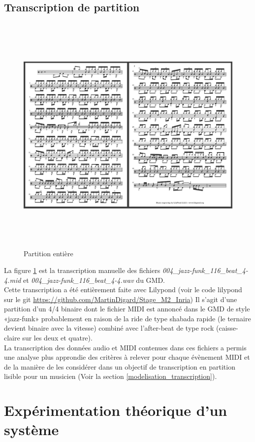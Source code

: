 \subsection*{Transcription de partition}
\begin{figure}[h]
	\includegraphics[height=120mm, width=160mm]{z_images/4_experimentations/1_analyse_midi_audio/3_partition.png}
	\caption{Partition entière}
	\label{partition_entiere}
\end{figure}
La figure \ref{partition_entiere} est la transcription manuelle des fichiers \textit{004\_jazz-funk\_116\_beat\_4-4.mid} et \textit{004\_jazz-funk\_116\_beat\_4-4.wav} du GMD.\\Cette transcription a été entièrement faite avec Lilypond (voir le code lilypond sur le git \url{https://github.com/MartinDigard/Stage_M2_Inria})
Il s’agit d’une partition d’un 4/4 binaire dont le fichier MIDI est annoncé dans le GMD de style «jazz-funk» probablement en raison de la ride de type shabada rapide (le ternaire devient binaire avec la vitesse) combiné avec l’after-beat de type rock (caisse-claire sur les deux et quatre).\\
La transcription des données audio et MIDI contenues dans ces fichiers a permis une analyse plus approndie des critères à relever pour chaque évènement MIDI et de la manière de les considérer dans un objectif de transcription en partition lisible pour un musicien (Voir la section \ref{modelisation_transcription}).
\section{Expérimentation théorique d’un système}
